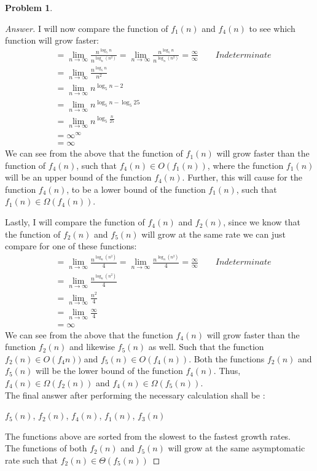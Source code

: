 \documentclass[11pt]{article}
\theoremstyle{definition}
\theoremstyle{definition}
\newtheorem{required}{Problem}
\theoremstyle{definition}
\begin{document}
\begin{required}
\begin{enumerate}[label=(\alph*)]
\begin{proof}[Answer]
I will now compare the function of $f_1(n)$ and  $f_4(n)$ to see which function will grow faster: \\
\begin{align*}
&= \lim_{n \to \infty} \frac{n^{\log_5 n}}{n^{\log_n(n^2)}} = \lim_{n \to \infty} \frac{n^{\log_5 n}}{n^{\log_n(n^2)}}  = \frac{\infty}{\infty} \qquad Indeterminate  \\
&= \lim_{n \to \infty} \frac{n^{\log_5 n}}{n^2} \\
&= \lim_{n \to \infty} n^{{\log_5 n}-{2}} \\
&= \lim_{n \to \infty} n^{{\log_5 n}-{\log_5 25}} \\
&= \lim_{n \to \infty} n^{\log_5 \frac{n}{25}}\\
&= \infty^{\infty}\\
&= \infty
\end{align*} 
We can see from the above that the function of $f_1(n)$ will grow faster than the function of $f_4(n)$, such that $f_4(n) \in O(f_1(n))$, where the function $f_1(n)$ will be an upper bound of the function $f_4(n)$. Further, this will cause for the function $f_4(n)$, to be a lower bound of the function $f_1(n)$, such that $f_1(n) \in \Omega(f_4(n))$.

Lastly, I will compare the function of $f_4(n)$ and $f_2(n)$, since we know that the function of $f_2(n)$ and $f_5(n)$ will grow at the same rate we can just compare for one of these functions:\\
\begin{align*}
&= \lim_{n \to \infty} \frac{n^{\log_n(n^2)}}{4} = \lim_{n \to \infty} \frac{n^{\log_n(n^2)}}{4} = \frac{\infty}{\infty} \qquad Indeterminate  \\
&= \lim_{n \to \infty} \frac{n^{\log_n(n^2)}}{4}  \\
&= \lim_{n \to \infty} \frac{n^{2}}{4}\\
&= \lim_{n \to \infty} \frac{\infty}{4} \\
&= \infty
\end{align*} 
We can see from the above that the function $f_4(n)$ will grow faster than the function $f_2(n)$ and likewise $f_5(n)$ as well. Such that the function $f_2(n) \in O(f_4n))$ and $f_5(n) \in O(f_4(n))$. Both the functions $f_2(n)$ and $f_5(n)$ will be the lower bound of the function $f_4(n)$. Thus, $f_4(n) \in \Omega(f_2(n))$ and $f_4(n) \in \Omega(f_5(n))$. \\

The final answer after performing the necessary calculation shall be : \\
\begin{center}
$f_5(n)$, $f_2(n)$, $f_4(n)$, $f_1(n)$, $f_3(n)$
\end{center}
The functions above are sorted from the slowest to the fastest growth rates. \\
The functions of both $f_2(n)$ and $f_5(n)$ will grow at the same asymptomatic rate such that $f_2(n) \in \Theta(f_5(n))$
        \end{proof}
        \newpage


\end{enumerate}
\end{required}
\end{document}
